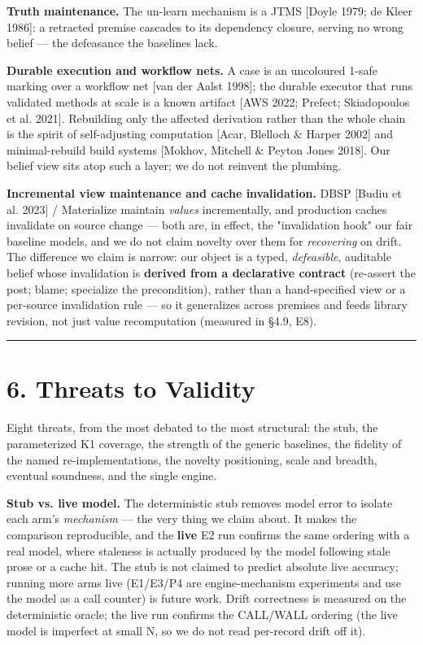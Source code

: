 \documentclass[11pt]{article}
\begin{document}
\textbf{Truth maintenance.} The un-learn mechanism is a JTMS [Doyle 1979; de Kleer 1986]: a retracted premise cascades to its dependency closure, serving no wrong belief — the defeasance the baselines lack.

\textbf{Durable execution and workflow nets.} A case is an uncoloured 1-safe marking over a workflow net [van der Aalst 1998]; the durable executor that runs validated methods at scale is a known artifact [AWS 2022; Prefect; Skiadopoulos et al. 2021]. Rebuilding only the affected derivation rather than the whole chain is the spirit of self-adjusting computation [Acar, Blelloch \& Harper 2002] and minimal-rebuild build systems [Mokhov, Mitchell \& Peyton Jones 2018]. Our belief view sits atop such a layer; we do not reinvent the plumbing.

\textbf{Incremental view maintenance and cache invalidation.} DBSP [Budiu et al. 2023] / Materialize maintain \emph{values} incrementally, and production caches invalidate on source change — both are, in effect, the "invalidation hook" our fair baseline models, and we do not claim novelty over them for \emph{recovering} on drift. The difference we claim is narrow: our object is a typed, \emph{defeasible}, auditable belief whose invalidation is \textbf{derived from a declarative contract} (re-assert the post; blame; specialize the precondition), rather than a hand-specified view or a per-source invalidation rule — so it generalizes across premises and feeds library revision, not just value recomputation (measured in §4.9, E8).

\medskip\hrule\medskip

\section*{6. Threats to Validity}

Eight threats, from the most debated to the most structural: the stub, the parameterized K1 coverage, the strength of the generic baselines, the fidelity of the named re-implementations, the novelty positioning, scale and breadth, eventual soundness, and the single engine.

\textbf{Stub vs. live model.} The deterministic stub removes model error to isolate each arm's \emph{mechanism} — the very thing we claim about. It makes the comparison reproducible, and the \textbf{live} E2 run confirms the same ordering with a real model, where staleness is actually produced by the model following stale prose or a cache hit. The stub is not claimed to predict absolute live accuracy; running more arms live (E1/E3/P4 are engine-mechanism experiments and use the model as a call counter) is future work. Drift correctness is measured on the deterministic oracle; the live run confirms the CALL/WALL ordering (the live model is imperfect at small N, so we do not read per-record drift off it).
\end{document}
